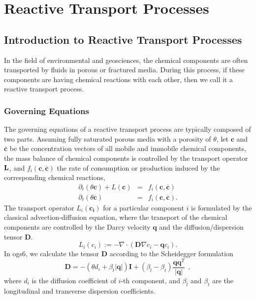 \chapter{Reactive Transport Processes}

\section{Introduction to Reactive Transport Processes}

In the field of environmental and geosciences, the chemical components are often transported by fluids in porous or fractured media. During this process, if these components are having chemical reactions with each other, then we call it a reactive transport process. 

\subsection{Governing Equations}

The governing equations of a reactive transport process are typically composed of two parts. Assuming fully saturated porous media with a porosity of $\theta$, let $\mathbf{c}$ and $\mathbf{\overline{c}}$ be the concentration vectors of all mobile and immobile chemical components, the mass balance of chemical components is controlled by the transport operator $\bf{L}$, and $f_{i}(\mathbf{c}, \mathbf{\overline{c}})$ the rate of consumption or production induced by the corresponding chemical reactions, 
\begin{eqnarray}
\label{eqn:RT_react_trans}
\partial_{t} ( \theta \mathbf{c} ) + L (\mathbf{c}) &=&  f_{i}(\mathbf{c}, \mathbf{\overline{c}}) \nonumber \\ 
\partial_{t} ( \theta \mathbf{\overline{c}} ) &=&  f_{i}(\mathbf{c}, \mathbf{\overline{c}}). 
\end{eqnarray}
The transport operator $L_i(\mathbf{c_i})$ for a particular component $i$ is formulated by the classical advection-diffusion equation, where the transport of the chemical components are controlled by the Darcy velocity $\mathbf{q}$ and the diffusion/dispersion tensor $\mathbf{D}$.  
\begin{equation}
L_i(c_i) := - \nabla \cdot ( \mathbf{D} \nabla c_i - \mathbf{q} c_i) . 
\end{equation}
In ogs6, we calculate the tensor $\mathbf{D}$ according to the Scheidegger formulation \cite{Scheidegger1961}
\begin{equation}
\mathbf{D} = -(\theta d_{i} + \beta_t \left| \mathbf{q} \right|) \mathbf{I} + (\beta_l - \beta_t) \frac{\mathbf{q} \mathbf{q}^T}{\left| \mathbf{q} \right| }~~, 
\end{equation}
where $d_i$ is the diffusion coefficient of $i$-th component, and $\beta_l$ and $\beta_t$ are the longitudinal and transverse dispersion coefficients. 

